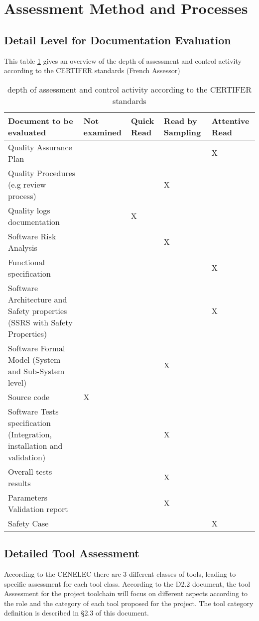 \documentclass[openetcs]{template/openetcs_article}
\begin{document}
\newpage
\section{Assessment Method and Processes}

\subsection{Detail Level for Documentation Evaluation}

This table \ref{table:depthofassessment} gives an overview of the depth of assessment and control activity according to the CERTIFER standards (French Assessor)

\begin{table}
\begin{tabular}{p{5cm}|>{\centering\arraybackslash}p{2cm}|>{\centering\arraybackslash}p{2cm}|
	>{\centering\arraybackslash}p{2cm}|>{\centering\arraybackslash}p{2cm}|} 
\hline
\textbf{Document to be evaluated} & \textbf{Not examined} & \textbf{Quick Read} & \textbf{Read by Sampling} & \textbf{Attentive Read} \\ \hline
Quality Assurance Plan & & & & X \\ \hline
Quality Procedures (e.g review process) & & & X & \\ \hline
Quality logs documentation & & X & & \\ \hline
Software Risk Analysis & & & X & \\ \hline
Functional specification & & & & X \\ \hline
Software Architecture and Safety properties (SSRS with Safety Properties) & & & & X \\ \hline
Software Formal Model (System and Sub-System level) & & & X & \\ \hline
Source code & X & & & \\ \hline
Software Tests specification (Integration, installation and validation) & & & X & \\ \hline
Overall tests results & & & X & \\ \hline
Parameters Validation report & & & X & \\ \hline
Safety Case & & & & X \\ \hline
\end{tabular}
\caption{depth of assessment and control activity according to the CERTIFER standards}
\label{table:depthofassessment}
\end{table}


\subsection{Detailed Tool Assessment}
According to the CENELEC there are 3 different classes of tools, leading to specific assessment for each tool class. According to the D2.2 document, the tool
Assessment for the project toolchain will focus on different aspects according to the role and the category of each tool proposed for the project. The tool
category definition is described in \S 2.3 of this document.
\end{document}
